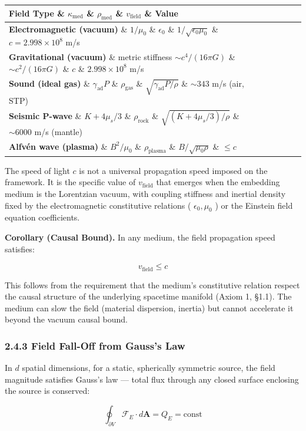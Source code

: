 \documentclass[11pt,a4paper]{article}
\theoremstyle{definition}\newtheorem{definition}{Definition}
\theoremstyle{remark}\newtheorem{remark}{Remark}
\begin{document}
\begin{longtable}{lllll}
\hline
Field Type \& $\kappa_{\text{med}}$ \& $\rho_{\text{med}}$ \& $v_{\text{field}}$ \& Value \\
\hline
\textbf{Electromagnetic (vacuum)} \& $1/\mu_0$ \& $\epsilon_0$ \& $1/\sqrt{\epsilon_0 \mu_0}$ \& $c = 2.998 \times 10^8$ m/s \\
\textbf{Gravitational (vacuum)} \& metric stiffness $\sim c^4/(16\pi G)$ \& $\sim c^2/(16\pi G)$ \& $c$ \& $2.998 \times 10^8$ m/s \\
\textbf{Sound (ideal gas)} \& $\gamma_{\text{ad}} P$ \& $\rho_{\text{gas}}$ \& $\sqrt{\gamma_{\text{ad}} P / \rho}$ \& $\sim 343$ m/s (air, STP) \\
\textbf{Seismic P-wave} \& $K + 4\mu_s/3$ \& $\rho_{\text{rock}}$ \& $\sqrt{(K + 4\mu_s/3)/\rho}$ \& $\sim 6000$ m/s (mantle) \\
\textbf{Alfvén wave (plasma)} \& $B^2/\mu_0$ \& $\rho_{\text{plasma}}$ \& $B/\sqrt{\mu_0 \rho}$ \& $\leq c$ \\
\hline
\end{longtable}
The speed of light $c$ is not a universal propagation speed imposed on the framework. It is the specific value of $v_{\text{field}}$ that emerges when the embedding medium is the Lorentzian vacuum, with coupling stiffness and inertial density fixed by the electromagnetic constitutive relations ( $\epsilon_0, \mu_0$ ) or the Einstein field equation coefficients.

\textbf{Corollary (Causal Bound).} In any medium, the field propagation speed satisfies:


\begin{equation}
v_{\text{field}} \leq c
\end{equation}


This follows from the requirement that the medium's constitutive relation respect the causal structure of the underlying spacetime manifold (Axiom 1, §1.1). The medium can slow the field (material dispersion, inertia) but cannot accelerate it beyond the vacuum causal bound.
\subsubsection{2.4.3 Field Fall-Off from Gauss's Law}

In $d$ spatial dimensions, for a static, spherically symmetric source, the field magnitude satisfies Gauss's law — total flux through any closed surface enclosing the source is conserved:


\begin{equation}
\oint_{\partial V} \mathcal{F}_E \cdot d\mathbf{A} = Q_E = \text{const}
\end{equation}
\end{document}
